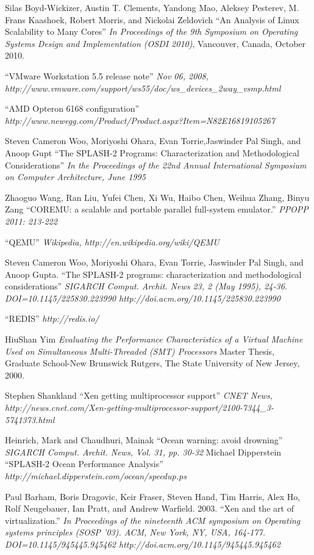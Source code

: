 \begin{thebibliography}{9}
Silas Boyd-Wickizer, Austin T. Clements, Yandong Mao, Aleksey Pesterev,
M. Frans Kaashoek, Robert Morris, and Nickolai Zeldovich
``An Analysis of Linux Scalability to Many Cores''
{\em In Proceedings of the 9th Symposium on Operating Systems Design and Implementation (OSDI 2010)}, Vancouver, Canada, October 2010.

``VMware Workstation 5.5 release note''
{\em Nov 06, 2008, http://www.vmware.com/support/ws55/doc/ws\_devices\_2way\_vsmp.html} 

``AMD Opteron 6168 configuration''
{\em http://www.newegg.com/Product/Product.aspx?Item=N82E16819105267}

Steven Cameron Woo, Moriyoshi Ohara, Evan Torrie,Jaswinder Pal Singh,
and Anoop Gupt
``The SPLASH-2 Programs: Characterization and Methodological Considerations''
{\em In the Proceedings of the 22nd Annual International Symposium on Computer Architecture, June 1995}

Zhaoguo Wang, Ran Liu, Yufei Chen, Xi Wu, Haibo Chen, Weihua Zhang, Binyu Zang
``COREMU: a scalable and portable parallel full-system emulator.''
{\em PPOPP 2011: 213-222}

``QEMU''
{\em Wikipedia, http://en.wikipedia.org/wiki/QEMU}

Steven Cameron Woo, Moriyoshi Ohara, Evan Torrie, Jaswinder Pal Singh, and Anoop Gupta. 
``The SPLASH-2 programs: characterization and methodological considerations''
{\em SIGARCH Comput. Archit. News 23, 2 (May 1995), 24-36. DOI=10.1145/225830.223990 http://doi.acm.org/10.1145/225830.223990} 

``REDIS'' {\em http://redis.io/}

HiuShan Yim
{\em Evaluating the Performance Characteristics of a Virtual Machine Used on Simultaneous Multi-Threaded (SMT) Processors}
Master Thesis, Graduate School-New Brunswick Rutgers, 
The State University of New Jersey, 2000.

Stephen Shankland
``Xen getting multiprocessor support''
{\em CNET News, http://news.cnet.com/Xen-getting-multiprocessor-support/2100-7344\_3-5741373.html}

Heinrich, Mark and Chaudhuri, Mainak
``Ocean warning: avoid drowning''
{\em SIGARCH Comput. Archit. News, Vol. 31, pp. 30-32}
Michael Dipperstein
``SPLASH-2 Ocean Performance Analysis''
{\em http://michael.dipperstein.com/ocean/speedup.ps}

Paul Barham, Boris Dragovic, Keir Fraser, Steven Hand, Tim Harris, Alex Ho, Rolf Neugebauer, Ian Pratt, and Andrew Warfield. 2003.
``Xen and the art of virtualization.''
{\em In Proceedings of the nineteenth ACM symposium on Operating systems principles (SOSP '03). ACM, New York, NY, USA, 164-177. DOI=10.1145/945445.945462 http://doi.acm.org/10.1145/945445.945462}

\end{thebibliography}

